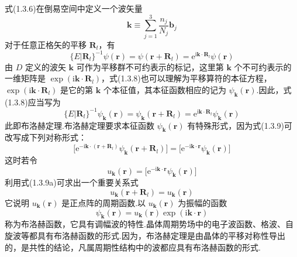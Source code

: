 式(1.3.6)在倒易空间中定义一个波矢量
\begin{equation}
  \boldsymbol{k}\equiv\sum_{j=1}^{3}\frac{n_j}{N_j}\boldsymbol{b}_j
\end{equation}
对于任意正格矢的平移 $\boldsymbol{R}_l$，有
\begin{equation}
  \{E|\boldsymbol{R}_l\}^{-1}\psi(\boldsymbol{r})
  =\psi(\boldsymbol{r}+\boldsymbol{R}_l)
  =\mathrm{e}^{\mathrm{i}\boldsymbol{k}\cdot\boldsymbol{R}_l}\psi(\boldsymbol{r})
\end{equation}
由 $D$ 定义的波矢 $\boldsymbol{k}$ 可作为平移群不可约表示的标记，这里第 $\boldsymbol{k}$ 个不可约表示的一维矩阵是 $\exp(\mathrm{i}\boldsymbol{k}\cdot\boldsymbol{R}_l)$，式(1.3.8)也可以理解为平移算符的本征方程，$\exp(\mathrm{i}\boldsymbol{k}\cdot\boldsymbol{R}_l)$ 是它的第 $\boldsymbol{k}$ 个本征值，其本征函数相应的记为 $\psi_{\boldsymbol{k}}(\boldsymbol{r})$.因此，式(1.3.8)应当写为
\begin{equation}
  \{E|\boldsymbol{R}_l\}^{-1}\psi_{\boldsymbol{k}}(\boldsymbol{r})
  =\psi_{\boldsymbol{k}}(\boldsymbol{r}+\boldsymbol{R}_l)
  =\mathrm{e}^{\mathrm{i}\boldsymbol{k}\cdot\boldsymbol{R}_l}\psi_{\boldsymbol{k}}(\boldsymbol{r})
\end{equation}
此即布洛赫定理.布洛赫定理要求本征函数 $\psi_{\boldsymbol{k}}(\boldsymbol{r})$ 有特殊形式，因为式(1.3.9)可改写成下列对称形式：
\begin{equation*}
  \bigl[\mathrm{e}^{-\mathrm{i}\boldsymbol{k}\cdot(\boldsymbol{r}+\boldsymbol{R}_l)}
  \psi_{\boldsymbol{k}}(\boldsymbol{r}+\boldsymbol{R}_l)\bigr]
  =\bigl[\mathrm{e}^{-\mathrm{i}\boldsymbol{k}\cdot\boldsymbol{r}}
  \psi_{\boldsymbol{k}}(\boldsymbol{r})\bigr]\tag{1.3.9a}
\end{equation*}
这时若令
\begin{equation*}
  u_{\boldsymbol{k}}(\boldsymbol{r})
  =\bigl[\mathrm{e}^{-\mathrm{i}\boldsymbol{k}\cdot\boldsymbol{r}}
  \psi_{\boldsymbol{k}}(\boldsymbol{r})\bigr]
\end{equation*}
利用式(1.3.9a)可求出一个重要关系式
\begin{equation}
  u_{\boldsymbol{k}}(\boldsymbol{r}+\boldsymbol{R}_l)=u_{\boldsymbol{k}}(\boldsymbol{r})
\end{equation}
它说明 $u_{\boldsymbol{k}}(\boldsymbol{r})$ 是正点阵的周期函数.以 $u_{\boldsymbol{k}}(\boldsymbol{r})$ 为振幅的函数
\begin{equation}
  \psi_{\boldsymbol{k}}(\boldsymbol{r})
  =u_{\boldsymbol{k}}(\boldsymbol{r})\exp(\mathrm{i}\boldsymbol{k}\cdot\boldsymbol{r})
\end{equation}
称为布洛赫函数，它具有调幅波的特性.晶体周期势场中的电子波函数、格波、自旋波等都具有布洛赫函数的形式.因为，布洛赫定理是由晶体的平移对称性导出的，是共性的结论，凡属周期性结构中的波都应具有布洛赫函数的形式.


